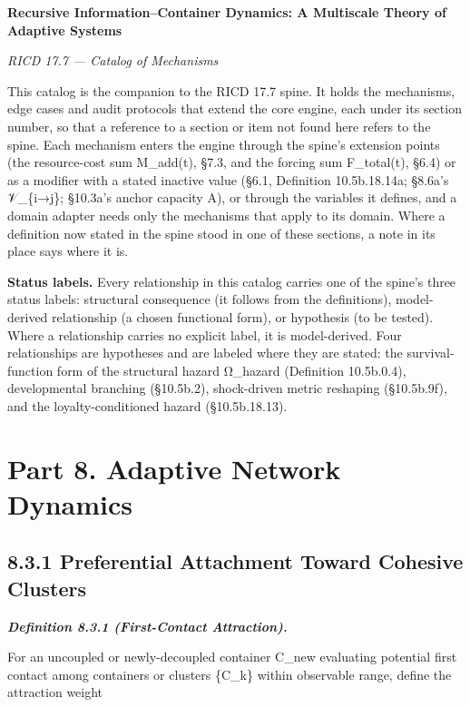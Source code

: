\documentclass[
]{article}
\author{}
\date{}
\begin{document}
\textbf{Recursive Information--Container Dynamics: A Multiscale Theory
of Adaptive Systems}

\emph{RICD 17.7 --- Catalog of Mechanisms}

This catalog is the companion to the RICD 17.7 spine. It holds the
mechanisms, edge cases and audit protocols that extend the core engine,
each under its section number, so that a reference to a section or item
not found here refers to the spine. Each mechanism enters the engine
through the spine's extension points (the resource-cost sum M\_add(t),
§7.3, and the forcing sum F\_total(t), §6.4) or as a modifier with a
stated inactive value (§6.1, Definition 10.5b.18.14a; §8.6a's
𝒱\_\{i→j\}; §10.3a's anchor capacity A), or through the variables it
defines, and a domain adapter needs only the mechanisms that apply to
its domain. Where a definition now stated in the spine stood in one of
these sections, a note in its place says where it is.

\textbf{Status labels.} Every relationship in this catalog carries one
of the spine's three status labels: structural consequence (it follows
from the definitions), model-derived relationship (a chosen functional
form), or hypothesis (to be tested). Where a relationship carries no
explicit label, it is model-derived. Four relationships are hypotheses
and are labeled where they are stated: the survival-function form of the
structural hazard Ω\_hazard (Definition 10.5b.0.4), developmental
branching (§10.5b.2), shock-driven metric reshaping (§10.5b.9f), and the
loyalty-conditioned hazard (§10.5b.18.13).

\hypertarget{part-8.-adaptive-network-dynamics}{%
\section{Part 8. Adaptive Network
Dynamics}\label{part-8.-adaptive-network-dynamics}}

\hypertarget{preferential-attachment-toward-cohesive-clusters}{%
\subsection{8.3.1 Preferential Attachment Toward Cohesive
Clusters}\label{preferential-attachment-toward-cohesive-clusters}}

\emph{\textbf{Definition 8.3.1 (First-Contact Attraction).}}

For an uncoupled or newly-decoupled container C\_new evaluating
potential first contact among containers or clusters \{C\_k\} within
observable range, define the attraction weight
\end{document}
